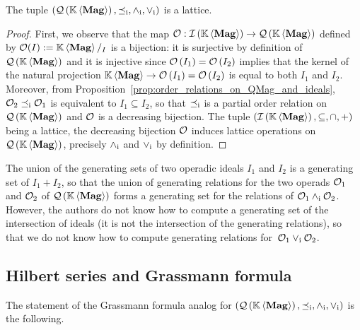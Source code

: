 \begin{Theorem} \label{thm:lattice_structure_of_QMag}
    The tuple $\LatQMag$ is a lattice.
\end{Theorem}
\begin{proof}
    First, we observe that the map $\Oca:\IMag\to\QMag$ defined by
    $\Oca(I) := \KMag/_I$ is a bijection: it is surjective by definition
    of $\QMag$ and it is injective since
    \begin{math}
        \Oca\left(I_1\right) = \Oca\left(I_2\right)
    \end{math}
    implies that the kernel of the natural projection
    \begin{math}
        \KMag\to\Oca\left(I_1\right) = \Oca\left(I_2\right)
    \end{math}
    is equal to both $I_1$ and $I_2$. Moreover, from
    Proposition~\ref{prop:order_relations_on_QMag_and_ideals},
    $\Oca_2\OrdQMag\Oca_1$ is equivalent to $I_1\subseteq I_2$, so that
    $\OrdQMag$ is a partial order relation on $\QMag$ and $\Oca$ is a
    decreasing bijection. The tuple
    $\left(\IMag,\subseteq,\cap,+\right)$ being a lattice, the
    decreasing bijection $\Oca$ induces lattice operations on $\QMag$,
    precisely $\InfQMag$ and $\SupQMag$ by definition.
\end{proof}
\medbreak

The union of the generating sets of two operadic ideals $I_1$ and $I_2$
is a generating set of $I_1+I_2$, so that the union of generating
relations for the two operads $\Oca_1$ and $\Oca_2$ of $\QMag$ forms a
generating set for the relations of $\Oca_1\InfQMag\Oca_2$. However, the
authors do not know how to compute a generating set of the intersection
of ideals (it is not the intersection of the generating relations), so
that we do not know how to compute generating relations
for~$\Oca_1\SupQMag\Oca_2$.
\medbreak

\subsection{Hilbert series and Grassmann formula}
The statement of the Grassmann formula analog for $\LatQMag$ is the
following.
\medbreak

